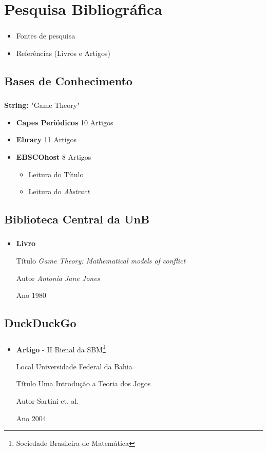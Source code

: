 \section{Pesquisa Bibliográfica}
\begin{frame}
\frametitle{\secname}
\begin{itemize}
	\item Fontes de pesquisa
	\item Referências (Livros e Artigos)
\end{itemize}
\end{frame}

\subsection *{Bases de Conhecimento}
\begin{frame}
\frametitle{\subsecname}
\textbf{String:} "Game Theory"
\begin{itemize}
\item \textbf{Capes Periódicos} 10 Artigos
\item \textbf{Ebrary} 11 Artigos
\item \textbf{EBSCOhost} 8 Artigos
\begin{itemize}
	\item Leitura do Título
	\item Leitura do \textit{Abstract}
\end{itemize}
\end{itemize}
\end{frame}

\subsection*{Biblioteca Central da UnB}
\begin{frame}
\frametitle{\subsecname}
\begin{itemize}
	\item \textbf{Livro}
	\item[Título] \emph{Game Theory: Mathematical models of conflict}
	\item[Autor] \emph{Antonia Jane Jones}
	\item[Ano] 1980
\end{itemize}
\end{frame}

\subsection*{DuckDuckGo}
\begin{frame}
\frametitle{\subsecname}
\begin{itemize}
	\item \textbf{Artigo} - II Bienal da SBM\footnote{Sociedade Brasileira de Matemática}
	\item[Local] Universidade Federal da Bahia
	\item[Título] Uma Introdução a Teoria dos Jogos
	\item[Autor] Sartini et. al.
	\item[Ano] 2004
\end{itemize}
\end{frame}
